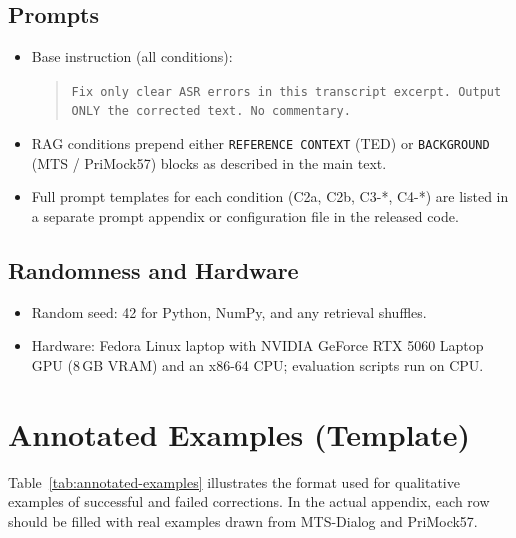 \documentclass[11pt,a4paper]{article}
\begin{document}
\subsection*{Prompts}
\begin{itemize}[leftmargin=1.4em]
  \item Base instruction (all conditions):
\begin{quote}\small
\texttt{Fix only clear ASR errors in this transcript excerpt. Output ONLY the corrected text. No commentary.}
\end{quote}
  \item RAG conditions prepend either \texttt{REFERENCE CONTEXT} (TED) or
        \texttt{BACKGROUND} (MTS / PriMock57) blocks as described in the main text.
  \item Full prompt templates for each condition (C2a, C2b, C3-*, C4-*) are listed
        in a separate prompt appendix or configuration file in the released code.
\end{itemize}

\subsection*{Randomness and Hardware}
\begin{itemize}[leftmargin=1.4em]
  \item Random seed: 42 for Python, NumPy, and any retrieval shuffles.
  \item Hardware: Fedora Linux laptop with NVIDIA GeForce RTX 5060 Laptop GPU
        (8\,GB VRAM) and an x86-64 CPU; evaluation scripts run on CPU.
\end{itemize}

\section{Annotated Examples (Template)}
\label{app:examples}

Table~\ref{tab:annotated-examples} illustrates the format used for qualitative
examples of successful and failed corrections. In the actual appendix, each
row should be filled with real examples drawn from MTS-Dialog and PriMock57.
\end{document}
